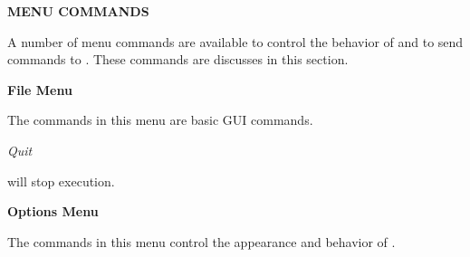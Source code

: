 {\bf MENU COMMANDS}

A number of menu commands are available to control the behavior of
 and to send commands to .  These commands
are discusses in this section.

{\bf File Menu}

The commands in this menu are basic GUI commands.

\begin{description}

\item {\it Quit}

 will stop execution.

\end{description}

{\bf Options Menu}

The commands in this menu control the appearance and behavior of
.

